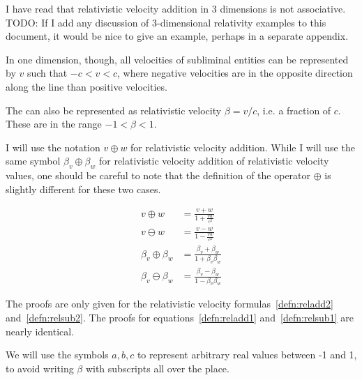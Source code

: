 \documentclass[a4paper]{article}
\theoremstyle{plain}
\theoremstyle{definition}
\begin{document}
I have read that relativistic velocity addition in 3 dimensions is not
associative.  TODO: If I add any discussion of 3-dimensional
relativity examples to this document, it would be nice to give an
example, perhaps in a separate appendix.

In one dimension, though, all velocities of subliminal entities can be
represented by $v$ such that $-c < v < c$, where negative velocities
are in the opposite direction along the line than positive velocities.

The can also be represented as relativistic velocity $\beta = v/c$,
i.e. a fraction of $c$.  These are in the range $-1 < \beta < 1$.

I will use the notation $v \oplus w$ for relativistic velocity
addition.  While I will use the same symbol $\beta_v \oplus \beta_w$
for relativistic velocity addition of relativistic velocity values,
one should be careful to note that the definition of the operator
$\oplus$ is slightly different for these two cases.

\begin{align}
v \oplus w & = \frac{v+w}{1+\frac{vw}{c^2}} \label{defn:reladd1} \\
v \ominus w & = \frac{v-w}{1-\frac{vw}{c^2}} \label{defn:relsub1} \\
\beta_v \oplus \beta_w & = \frac{\beta_v+\beta_w}{1+\beta_v \beta_w} \label{defn:reladd2} \\
\beta_v \ominus \beta_w & = \frac{\beta_v-\beta_w}{1- \beta_v \beta_w} \label{defn:relsub2}
\end{align}

The proofs are only given for the relativistic velocity
formulas~\eqref{defn:reladd2} and~\eqref{defn:relsub2}.  The proofs
for equations~\eqref{defn:reladd1}
and~\eqref{defn:relsub1} are nearly identical.

We will use the symbols $a, b, c$ to represent arbitrary real values
between -1 and 1, to avoid writing $\beta$ with subscripts all over
the place.
\end{document}
